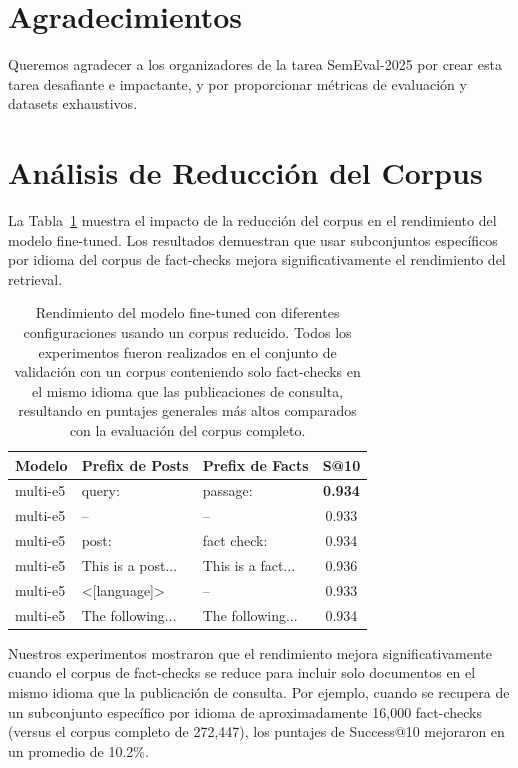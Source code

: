 \documentclass[11pt]{article}
\begin{document}
\section{Agradecimientos}

Queremos agradecer a los organizadores de la tarea SemEval-2025 por crear esta tarea desafiante e impactante, y por proporcionar métricas de evaluación y datasets exhaustivos.

%


\appendix

\section{Análisis de Reducción del Corpus}
\label{sec:appendix-results}

La Tabla~\ref{tab:prefix-experiments} muestra el impacto de la reducción del corpus en el rendimiento del modelo fine-tuned. Los resultados demuestran que usar subconjuntos específicos por idioma del corpus de fact-checks mejora significativamente el rendimiento del retrieval.

\begin{table}[h]
  \centering
  \small
  \begin{tabular}{p{1.6cm}p{1.8cm}p{1.8cm}c}
    \hline
    \textbf{Modelo} & \textbf{Prefix de Posts} & \textbf{Prefix de Facts} & \textbf{S@10} \\
    \hline
    multi-e5 & query: & passage: & \textbf{0.934} \\
    multi-e5 & -- & -- & 0.933 \\
    multi-e5 & post: & fact check: & 0.934 \\
    multi-e5 & This is a post... & This is a fact... & 0.936 \\
    multi-e5 & <[language]> & -- & 0.933 \\
    multi-e5 & The following... & The following... & 0.934 \\
    \hline
  \end{tabular}
  \caption{Rendimiento del modelo fine-tuned con diferentes configuraciones usando un corpus reducido. Todos los experimentos fueron realizados en el conjunto de validación con un corpus conteniendo solo fact-checks en el mismo idioma que las publicaciones de consulta, resultando en puntajes generales más altos comparados con la evaluación del corpus completo.}
  \label{tab:prefix-experiments}
\end{table}

Nuestros experimentos mostraron que el rendimiento mejora significativamente cuando el corpus de fact-checks se reduce para incluir solo documentos en el mismo idioma que la publicación de consulta. Por ejemplo, cuando se recupera de un subconjunto específico por idioma de aproximadamente 16,000 fact-checks (versus el corpus completo de 272,447), los puntajes de Success@10 mejoraron en un promedio de 10.2\%.
\end{document}
